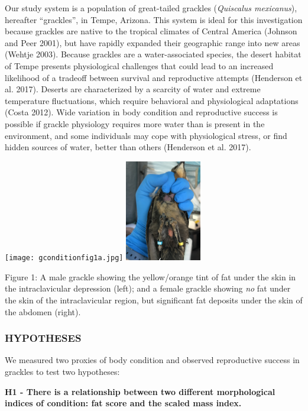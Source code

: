 \documentclass[
]{article}
\begin{document}
Our study system is a population of great-tailed grackles
(\emph{Quiscalus mexicanus}), hereafter ``grackles'', in Tempe, Arizona.
This system is ideal for this investigation because grackles are native
to the tropical climates of Central America (Johnson and Peer 2001), but
have rapidly expanded their geographic range into new areas (Wehtje
2003). Because grackles are a water-associated species, the desert
habitat of Tempe presents physiological challenges that could lead to an
increased likelihood of a tradeoff between survival and reproductive
attempts (Henderson et al. 2017). Deserts are characterized by a
scarcity of water and extreme temperature fluctuations, which require
behavioral and physiological adaptations (Costa 2012). Wide variation in
body condition and reproductive success is possible if grackle
physiology requires more water than is present in the environment, and
some individuals may cope with physiological stress, or find hidden
sources of water, better than others (Henderson et al. 2017).

\texttt{[image: gconditionfig1a.jpg]}
\includegraphics[width=0.25\textwidth,height=\textheight]{gconditionfig1b.jpg}

Figure 1: A male grackle showing the yellow/orange tint of fat under the
skin in the intraclavicular depression (left); and a female grackle
showing \emph{no} fat under the skin of the intraclavicular region, but
significant fat deposits under the skin of the abdomen (right).

\hypertarget{hypotheses}{%
\subsubsection{HYPOTHESES}\label{hypotheses}}

We measured two proxies of body condition and observed reproductive
success in grackles to test two hypotheses:

\textbf{H1 - There is a relationship between two different morphological
indices of condition: fat score and the scaled mass index.}
\end{document}
